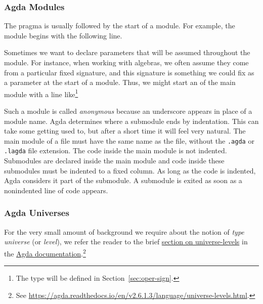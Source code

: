 \subsubsection{Agda Modules}\label{sec:agda-modules}
The  pragma is usually followed by the start of a module.  For example, the  module begins with the following line.
\ccpad
\begin{code}%
\>[0]\AgdaSpace{}%
\AgdaSpace{}%
\<%
\end{code}
\ccpad
Sometimes we want to declare parameters that will be assumed throughout the module.  For instance, when working with algebras, we often assume they come from a particular fixed signature, and this signature is something we could fix as a parameter at the start of a module. Thus, we might start an  of the main module with a line like\footnote{The  type will be defined in Section~\ref{sec:oper-sign}.}
\ccpad
\begin{code}%
\>[0]\AgdaSpace{}%
\AgdaUnderscore\AgdaSpace{}%
\AgdaSymbol{\{}\AgdaSpace{}%
\AgdaSymbol{:}\AgdaSpace{}%
\AgdaSpace{}%
\AgdaSpace{}%
\AgdaSymbol{\}}\AgdaSpace{}%
\<%
\end{code}
\ccpad
Such a module is called \emph{anonymous} because an underscore appears in place of a module name. Agda determines where a submodule ends by indentation.  This can take some getting used to, but after a short time it will feel very natural. The main module of a file must have the same name as the file, without the \texttt{.agda} or \texttt{.lagda} file extension.  The code inside the main module is not indented. Submodules are declared inside the main module and code inside these submodules must be indented to a fixed column.  As long as the code is indented, Agda considers it part of the submodule.  A submodule is exited as soon as a nonindented line of code appears.



\subsubsection{Agda Universes}\label{universes}

For the very small amount of background we require about the notion of \emph{type universe} (or \emph{level}), we refer the reader to the brief \href{https://agda.readthedocs.io/en/v2.6.1.3/language/universe-levels.html}{section
on universe-levels} in the \href{https://agda.readthedocs.io/en/v2.6.1.3/language/universe-levels.html}{Agda
documentation}.\footnote{See \url{https://agda.readthedocs.io/en/v2.6.1.3/language/universe-levels.html}.}

